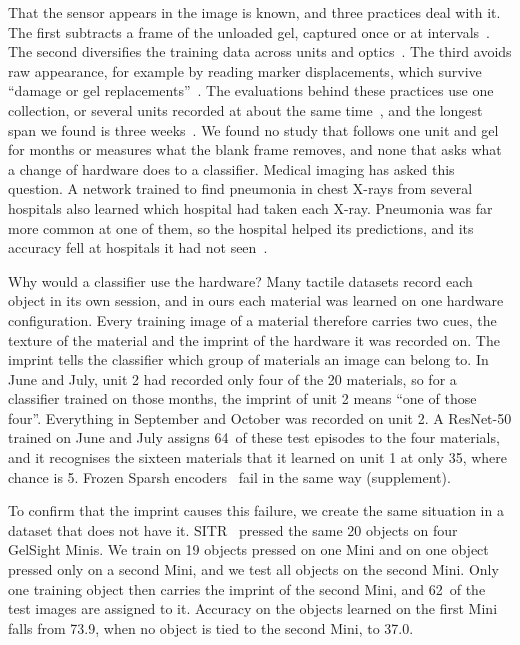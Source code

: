 That the sensor appears in the image is known, and three practices deal with it. The first subtracts a frame of the unloaded gel, captured once or at intervals~\cite{gelslim2018,tactic2026,higuera2024sparsh,sitr2025,anytouch2026two,htt2026}. The second diversifies the training data across units and optics~\cite{suresh2024neuralfeels,tactic2026,sitr2025}. The third avoids raw appearance, for example by reading marker displacements, which survive ``damage or gel replacements''~\cite{rdp2025}. The evaluations behind these practices use one collection, or several units recorded at about the same time~\cite{sitr2025,bideta2026,feats2025,tacverse2026,rct2026,anytouch2026two}, and the longest span we found is three weeks~\cite{tactilemnist2025}. We found no study that follows one unit and gel for months or measures what the blank frame removes, and none that asks what a change of hardware does to a classifier. Medical imaging has asked this question. A network trained to find pneumonia in chest X-rays from several hospitals also learned which hospital had taken each X-ray. Pneumonia was far more common at one of them, so the hospital helped its predictions, and its accuracy fell at hospitals it had not seen~\cite{zech2018hospital}.

Why would a classifier use the hardware? Many tactile datasets record each object in its own session, and in ours each material was learned on one hardware configuration. Every training image of a material therefore carries two cues, the texture of the material and the imprint of the hardware it was recorded on. The imprint tells the classifier which group of materials an image can belong to. In June and July, unit 2 had recorded only four of the 20 materials, so for a classifier trained on those months, the imprint of unit 2 means ``one of those four''. Everything in September and October was recorded on unit 2. A ResNet-50 trained on June and July assigns 64\pct\ of these test episodes to the four materials, and it recognises the sixteen materials that it learned on unit 1 at only 35\pct, where chance is 5\pct. Frozen Sparsh encoders~\cite{higuera2024sparsh} fail in the same way (supplement).

To confirm that the imprint causes this failure, we create the same situation in a dataset that does not have it. SITR~\cite{sitr2025} pressed the same 20 objects on four GelSight Minis. We train on 19 objects pressed on one Mini and on one object pressed only on a second Mini, and we test all objects on the second Mini. Only one training object then carries the imprint of the second Mini, and 62\pct\ of the test images are assigned to it. Accuracy on the objects learned on the first Mini falls from 73.9\pct, when no object is tied to the second Mini, to 37.0\pct.

